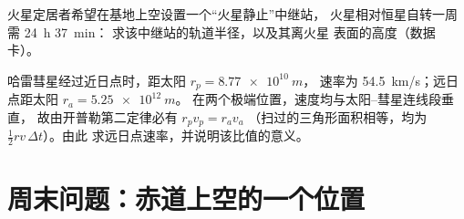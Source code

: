 \begin{exercise}[$\star\star\star$]\label{exo:g12:satellites-kepler:14}
火星定居者希望在基地上空设置一个“火星静止”中继站，
火星相对恒星自转一周需 \qty{24}{h} \qty{37}{min}：
求该中继站的轨道半径，以及其离火星
表面的高度（数据卡）。
\end{exercise}

\begin{exercise}[$\star\star\star$]\label{exo:g12:satellites-kepler:15}
哈雷彗星经过近日点时，距太阳 $r_p = \qty{8.77e10}{m}$，
速率为 \qty{54.5}{km/s}；远日点距太阳 $r_a = \qty{5.25e12}{m}$。
在两个极端位置，速度均与太阳–彗星连线段垂直，
故由开普勒第二定律必有 $r_p v_p = r_a v_a$
（扫过的三角形面积相等，均为 $\tfrac12 r v\,\Delta t$）。由此
求远日点速率，并说明该比值的意义。
\end{exercise}

\section{周末问题：赤道上空的一个位置}

